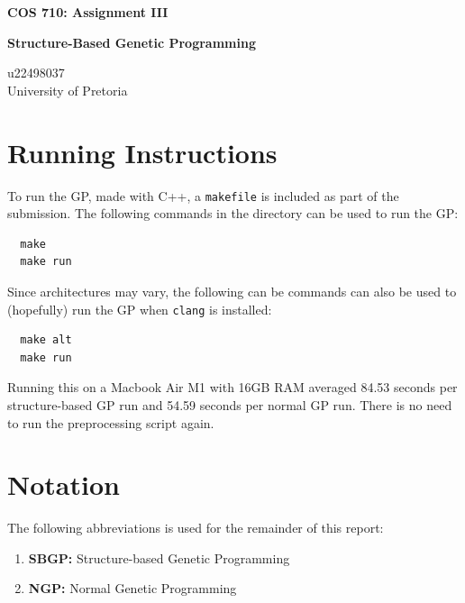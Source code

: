 \documentclass{article}
\begin{document}
\begin{titlepage}
\begin{center}


{\huge \textbf{COS 710: Assignment III}}

\vspace{1cm}

{\Large \textbf{Structure-Based Genetic Programming}}

\vspace{1cm}

{\large u22498037 \\
University of Pretoria}


\vfill

\end{center}
\end{titlepage}

\tableofcontents

\newpage

\section{Running Instructions}
To run the GP, made with C++, a \texttt{makefile} is included as part of the submission. The following commands in the directory can be used to run the GP:

\begin{verbatim}
  make
  make run
\end{verbatim}

Since architectures may vary, the following can be commands can also be used to (hopefully) run the GP when \texttt{clang} is installed:

\begin{verbatim}
  make alt
  make run
\end{verbatim}

Running this on a Macbook Air M1 with 16GB RAM averaged 84.53 seconds per structure-based GP run and 54.59 seconds per normal GP run. There is no need to run the preprocessing script again.

\section{Notation}
The following abbreviations is used for the remainder of this report:
\begin{enumerate}
  \item \textbf{SBGP:} Structure-based Genetic Programming
  \item \textbf{NGP:} Normal Genetic Programming
\end{enumerate}
\end{document}
